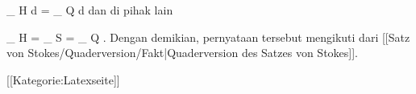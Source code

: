 {{\mavergleichskettedisp
{\vergleichskette
{
\int_{ H } d\omega
}
{ =} {
\int_{ Q } d\omega
}
{ } {
}
{ } {
}
{ } {
}
}
{}{}{}
dan di pihak lain

\mavergleichskettedisp
{\vergleichskette
{
\int_{ \partial H } \omega
}
{ = } {
\int_{ S } \omega
}
{ = } {
\int_{ \partial Q } \omega
}
{ } {
}
{ } {
}
}
{}{}{.}
Dengan demikian, pernyataan tersebut mengikuti dari [[Satz von Stokes/Quaderversion/Fakt|Quaderversion des Satzes von Stokes]].}
{}

 }
 [[Kategorie:Latexseite]]
